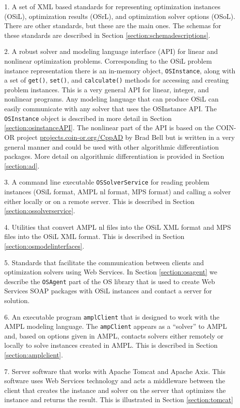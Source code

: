 \documentclass[11pt]{article}
\renewcommand{\_}{{\char"5F}}
\renewcommand{\{}{{\char"7B}}
\renewcommand{\}}{{\char"7D}}
\renewcommand{\^}{{\char"0D}}
\renewcommand{\'}{{\char"0D}}
\begin{document}
\begin{itemize}
\item[1.]  A set of XML based standards for representing optimization instances (OSiL), optimization results (OSrL), and optimization solver options (OSoL). There are other standards, but these are the main ones. The schemas for these standards are described in Section   \ref{section:schemadescriptions}.

\item[2.]  A robust solver and modeling language interface (API) for linear and nonlinear optimization problems.  Corresponding to the OSiL problem instance representation there is an in-memory object,  {\tt OSInstance}, along with a set of  {\tt get()},   {\tt set()}, and {\tt calculate()} methods for accessing and creating problem instances.  
This is a very general API for linear, integer, and nonlinear programs.  Any modeling language that can produce OSiL can easily communicate with any solver that uses the OSInstance API.   The {\tt OSInstance} object is described in more detail in Section \ref{section:osinstanceAPI}. The nonlinear part of the API is based on the COIN-OR project \url{projects.coin-or.org/CppAD} by Brad Bell but is written in a very general manner and could be used with other algorithmic differentiation packages. More detail on algorithmic differentiation is provided in Section \ref{section:ad}.


\item[3.]  A  command line executable {\tt OSSolverService}  for reading problem instances (OSiL format, AMPL  nl format,  MPS format) and calling a solver either locally or on a remote server.  This is described in Section \ref{section:ossolverservice}.


\item[4.] Utilities that convert AMPL nl files into the OSiL XML format and MPS files into the OSiL XML format.  This is described in Section \ref{section:osmodelinterfaces}.


\item[5.]  Standards that facilitate the communication between clients and optimization solvers using Web Services.  In  Section \ref{section:osagent} we describe the {\tt OSAgent} part of the OS library that is used to create Web Services
 SOAP packages with OSiL instances and contact a server for solution. 

\item[6.]  An executable program {\tt amplClient} that is designed to work with the AMPL modeling language. The {\tt ampClient} appears as a ``solver'' to AMPL and, based on options given in AMPL, contacts solvers either remotely or locally to solve instances created in AMPL. This is described in Section \ref{section:amplclient}.

\item[7.]  Server software that works with Apache Tomcat and Apache Axis.  
This software uses Web Services technology and acts a middleware between the client that creates the instance and solver on the server that optimizes the instance and returns the result. This is illustrated in Section  \ref{section:tomcat}
\end{itemize}
\end{document}
